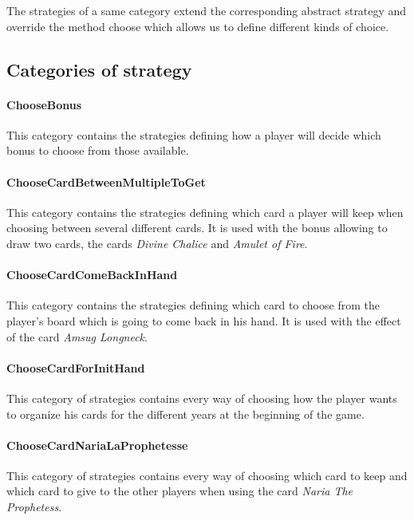         The strategies of a same category extend the corresponding abstract strategy and override the method choose which allows us to define different kinds of choice.
    
    \newpage
    \subsection{Categories of strategy}
    
        \paragraph{ChooseBonus}
        This category contains the strategies defining how a player will decide which bonus to choose from those available.
        
        \paragraph{ChooseCardBetweenMultipleToGet}
        This category contains the strategies defining which card a player will keep when choosing between several different cards. It is used with the bonus allowing to draw two cards, the cards \textit{Divine Chalice} and \textit{Amulet of Fire}.
        
        \paragraph{ChooseCardComeBackInHand}
        This category contains the strategies defining which card to choose from the player's board which is going to come back in his hand. It is used with the effect of the card \textit{Amsug Longneck}.
        
        \paragraph{ChooseCardForInitHand}
        This category of strategies contains every way of choosing how the player wants to organize his cards for the different years at the beginning of the game.
        
        \paragraph{ChooseCardNariaLaProphetesse}
        This category of strategies contains every way of choosing which card to keep and which card to give to the other players when using the card \textit{Naria The Prophetess}.
        
